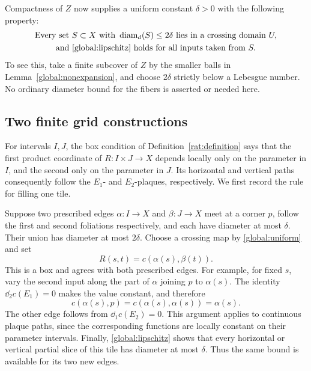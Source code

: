 Compactness of $Z$ now supplies a uniform constant $\delta>0$ with the
following property:
\begin{equation}\label{global:uniform}
 \begin{gathered}
 \text{Every set }S\subset X\text{ with }\operatorname{diam}_d(S)\leq2\delta
 \text{ lies in a crossing domain }U,\\
 \text{and \eqref{global:lipschitz} holds for all inputs taken from }S.
 \end{gathered}
\end{equation}
To see this, take a finite subcover of $Z$ by the smaller balls in
Lemma~\ref{global:nonexpansion}, and choose $2\delta$ strictly below a
Lebesgue number.  No ordinary diameter bound for the fibers is asserted
or needed here.

\subsection{Two finite grid constructions}

For intervals $I,J$, the box condition of
Definition~\ref{rat:definition} says that the first product coordinate of
$R:I\times J\to X$ depends locally only on the parameter in $I$, and
the second only on the parameter in $J$. Its horizontal and vertical
paths consequently follow the $E_1$- and $E_2$-plaques, respectively.
We first record the rule for filling one tile.

Suppose two prescribed edges $\alpha\colon I\to X$ and
$\beta\colon J\to X$ meet at a corner $p$, follow the first and second
foliations respectively, and each have diameter at most $\delta$.
Their union has diameter at most $2\delta$.  Choose a crossing map by
\eqref{global:uniform} and set
\begin{equation}\label{global:tile}
 R(s,t)=c(\alpha(s),\beta(t)).
\end{equation}
This is a box and agrees with both prescribed edges.  For example, for
fixed $s$, vary the second input along the part of $\alpha$ joining $p$
to $\alpha(s)$.  The identity $\dd_2c(E_1)=0$ makes the value constant,
and therefore
\[
 c(\alpha(s),p)=c(\alpha(s),\alpha(s))=\alpha(s).
\]
The other edge follows from $\dd_1c(E_2)=0$.  This argument applies to
continuous plaque paths, since the corresponding functions are locally
constant on their parameter intervals.  Finally,
\eqref{global:lipschitz} shows that every horizontal or vertical partial
slice of this tile has diameter at most $\delta$.  Thus the same bound
is available for its two new edges.

